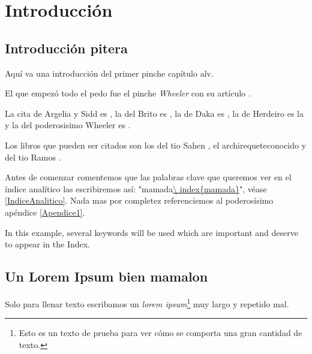 
\chapter{Introducción}
\label{capI}



\section{Introducción pitera}
\label{secIntroduccionCap1}


Aquí va una introducción del primer pinche capítulo alv.

El que empezó todo el pedo fue el pinche \textit{Wheeler} con su artículo \cite{Wheeler}.

La cita de Argelia y Sidd es \cite{Siddhartha-Argelia}, la del Brito es \cite{Brito}, la de Daka es \cite{Daka}, la de Herdeiro es la \cite{Herdeiro} y la del poderosisimo Wheeler es \cite{Wheeler}.

Los libros que pueden ser citados son los del tio Sahen \cite{Sahen}, el archirequeteconocido \cite{Schutz} y del tio Ramos \cite{Ramos-Sanchez}.

Antes de comenzar comentemos que las palabras clave que queremos ver en el índice analítico las escribiremos así: "mamada\url{\ index{mamada}}", véase \ref{IndiceAnalitico}. Nada mas por completez referenciemos al poderosísimo apéndice \ref{Apendice1}.

In this example, several keywords will be used which are important and deserve to appear in the Index.



\section{Un Lorem Ipsum bien mamalon}
\label{secLoremIpsumCap1}

Solo para llenar texto escribamos un \textit{lorem ipsum}\footnote{Esto es un texto de prueba para ver cómo se comporta una gran cantidad de texto.} muy largo y repetido mal.

